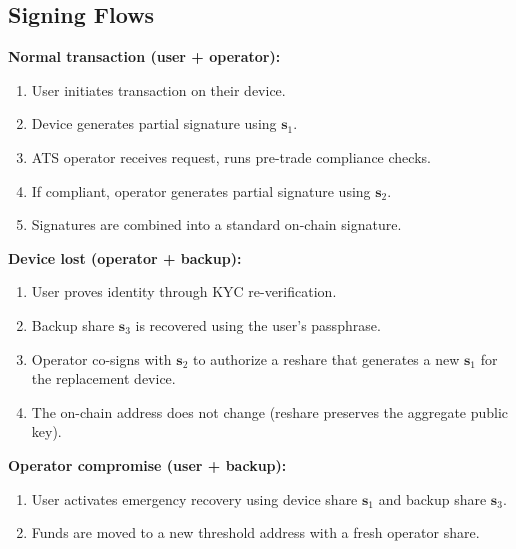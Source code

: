 \subsection{Signing Flows}

\textbf{Normal transaction (user + operator):}
\begin{enumerate}[nosep]
  \item User initiates transaction on their device.
  \item Device generates partial signature using $\mathbf{s}_1$.
  \item ATS operator receives request, runs pre-trade compliance checks.
  \item If compliant, operator generates partial signature using
        $\mathbf{s}_2$.
  \item Signatures are combined into a standard on-chain signature.
\end{enumerate}

\textbf{Device lost (operator + backup):}
\begin{enumerate}[nosep]
  \item User proves identity through KYC re-verification.
  \item Backup share $\mathbf{s}_3$ is recovered using the user's
        passphrase.
  \item Operator co-signs with $\mathbf{s}_2$ to authorize a reshare
        that generates a new $\mathbf{s}_1$ for the replacement device.
  \item The on-chain address does not change (reshare preserves the
        aggregate public key).
\end{enumerate}

\textbf{Operator compromise (user + backup):}
\begin{enumerate}[nosep]
  \item User activates emergency recovery using device share
        $\mathbf{s}_1$ and backup share $\mathbf{s}_3$.
  \item Funds are moved to a new threshold address with a fresh
        operator share.
\end{enumerate}

